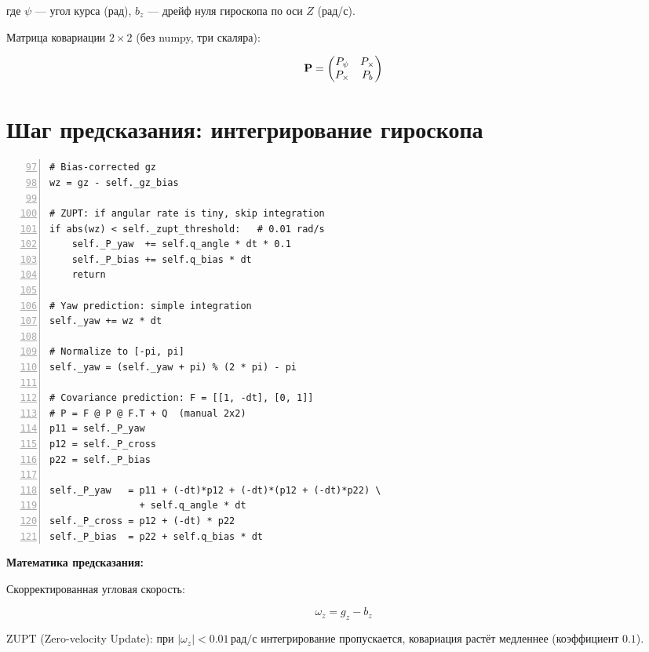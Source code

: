 где $\psi$ --- угол курса (рад), $b_z$ --- дрейф нуля гироскопа по оси $Z$ (рад/с).

Матрица ковариации $2\times2$ (без numpy, три скаляра):

\begin{equation}
  \mathbf{P} = \begin{pmatrix} P_\psi & P_{\times} \\ P_{\times} & P_b \end{pmatrix}
  \label{eq:yaw_cov}
\end{equation}

\section{Шаг предсказания: интегрирование гироскопа}
\label{sec:imu_predict}

\begin{filebox}[title={\filepath{ekf\_imu.py}, строки 85--122 --- predict()}]
\begin{lstlisting}[style=pythonstyle, numbers=left, firstnumber=97]
# Bias-corrected gz
wz = gz - self._gz_bias

# ZUPT: if angular rate is tiny, skip integration
if abs(wz) < self._zupt_threshold:   # 0.01 rad/s
    self._P_yaw  += self.q_angle * dt * 0.1
    self._P_bias += self.q_bias * dt
    return

# Yaw prediction: simple integration
self._yaw += wz * dt

# Normalize to [-pi, pi]
self._yaw = (self._yaw + pi) % (2 * pi) - pi

# Covariance prediction: F = [[1, -dt], [0, 1]]
# P = F @ P @ F.T + Q  (manual 2x2)
p11 = self._P_yaw
p12 = self._P_cross
p22 = self._P_bias

self._P_yaw   = p11 + (-dt)*p12 + (-dt)*(p12 + (-dt)*p22) \
                + self.q_angle * dt
self._P_cross = p12 + (-dt) * p22
self._P_bias  = p22 + self.q_bias * dt
\end{lstlisting}
\end{filebox}

\textbf{Математика предсказания:}

Скорректированная угловая скорость:

\begin{equation}
  \omega_z = g_z - b_z
  \label{eq:wz_corrected}
\end{equation}

ZUPT (Zero-velocity Update): при $|\omega_z| < 0.01\,\text{рад/с}$ интегрирование
пропускается, ковариация растёт медленнее (коэффициент $0.1$).

